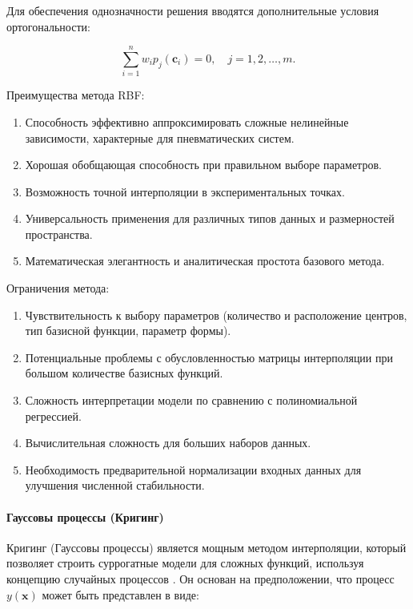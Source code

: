 Для обеспечения однозначности решения вводятся дополнительные условия ортогональности:

\begin{equation}
\sum_{i=1}^{n} w_i p_j(\mathbf{c}_i) = 0, \quad j = 1, 2, \ldots, m.
\end{equation}

Преимущества метода RBF:

\begin{enumerate}
	\item Способность эффективно аппроксимировать сложные нелинейные зависимости, характерные для пневматических систем.
	\item Хорошая обобщающая способность при правильном выборе параметров.
	\item Возможность точной интерполяции в экспериментальных точках.
	\item Универсальность применения для различных типов данных и размерностей пространства.
	\item Математическая элегантность и аналитическая простота базового метода.
\end{enumerate}

Ограничения метода:

\begin{enumerate}
	\item Чувствительность к выбору параметров (количество и расположение центров, тип базисной функции, параметр формы).
	\item Потенциальные проблемы с обусловленностью матрицы интерполяции при большом количестве базисных функций.
	\item Сложность интерпретации модели по сравнению с полиномиальной регрессией.
	\item Вычислительная сложность для больших наборов данных.
	\item Необходимость предварительной нормализации входных данных для улучшения численной стабильности.
\end{enumerate}

\paragraph{Гауссовы процессы (Кригинг)}\label{sec:ch4/sec3/subsec1/subsubsec3}

Кригинг (Гауссовы процессы) является мощным методом интерполяции,
который позволяет строить суррогатные модели для сложных функций,
используя концепцию случайных процессов \cite{gramacy2020surrogates}. Он основан
на предположении, что процесс \( y(\mathbf{x}) \) может быть представлен в виде:

